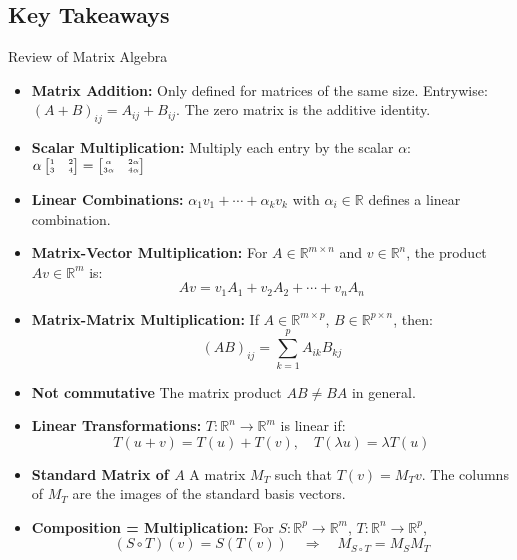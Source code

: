 \documentclass[a4paper, 9pt]{extarticle}
\begin{document}
\subsection*{Key Takeaways}
\begin{takeaway-box}{Review of Matrix Algebra}{}
\begin{itemize}
  \item \textbf{Matrix Addition:} Only defined for matrices of the same size. Entrywise: $(A + B)_{ij} = A_{ij} + B_{ij}$. The zero matrix is the additive identity.

  \item \textbf{Scalar Multiplication:} Multiply each entry by the scalar $\alpha$:
        $ \tiny
          \alpha \begin{bmatrix} 1 & 2 \\ 3 & 4 \end{bmatrix} =
          \begin{bmatrix} \alpha & 2\alpha \\ 3\alpha & 4\alpha \end{bmatrix}
        $
  \item \textbf{Linear Combinations:} $\alpha_1 v_1 + \cdots + \alpha_k v_k $ with $ \alpha_i \in \mathbb{R} $ defines a linear combination.

  \item \textbf{Matrix-Vector Multiplication:} For $ A \in \mathbb{R}^{m \times n} $ and $ v \in \mathbb{R}^n $, the product $ Av \in \mathbb{R}^m $ is:
        $$
          Av = v_1 A_1 + v_2 A_2 + \cdots + v_n A_n
        $$
  \item \textbf{Matrix-Matrix Multiplication:} If $ A \in \mathbb{R}^{m \times p} $, $ B \in \mathbb{R}^{p \times n} $, then:
        $$
          (AB)_{ij} = \sum_{k=1}^p A_{ik} B_{kj}
        $$
  \item  \textbf{Not commutative} The matrix product $AB \neq BA$ in general.
  \item \textbf{Linear Transformations:} $ T : \mathbb{R}^n \to \mathbb{R}^m $ is linear if:
        $$
          T(u + v) = T(u) + T(v), \quad T(\lambda u) = \lambda T(u)
        $$
  \item \textbf{Standard Matrix of $A$} A matrix $ M_T $ such that $ T(v) = M_T v $. The columns of $ M_T $ are the images of the standard basis vectors.

  \item \textbf{Composition = Multiplication:} For $ S : \mathbb{R}^p \to \mathbb{R}^m $, $ T : \mathbb{R}^n \to \mathbb{R}^p $,
        $$
          (S \circ T)(v) = S(T(v)) \quad \Rightarrow \quad M_{S \circ T} = M_S M_T
        $$
\end{itemize}
\end{takeaway-box}
\end{document}
